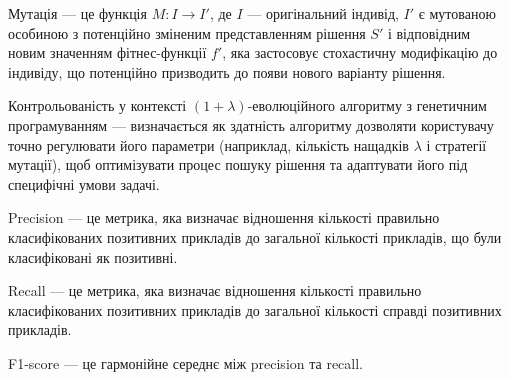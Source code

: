 Мутація --- це функція \( M: I \rightarrow I' \), де \( I \) — оригінальний індивід, \( I' \) є мутованою особиною з потенційно зміненим представленням рішення \( S' \) і відповідним новим значенням фітнес-функції \( f' \), яка застосовує стохастичну модифікацію до індивіду, що потенційно призводить до появи нового варіанту рішення.

Контрольованість у контексті $(1+\lambda)$-еволюційного алгоритму з генетичним програмуванням --- визначається як здатність алгоритму дозволяти користувачу точно регулювати його параметри (наприклад, кількість нащадків $\lambda$ і стратегії мутації), щоб оптимізувати процес пошуку рішення та адаптувати його під специфічні умови задачі.

Precision --- це метрика, яка визначає відношення кількості правильно класифікованих позитивних прикладів до загальної кількості прикладів, що були класифіковані як позитивні.

Recall --- це метрика, яка визначає відношення кількості правильно класифікованих позитивних прикладів до загальної кількості справді позитивних прикладів.

F1-score --- це гармонійне середнє між precision та recall.